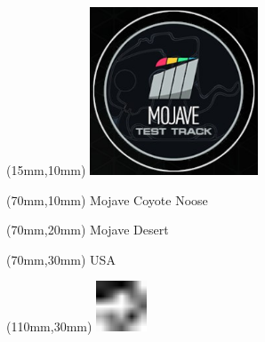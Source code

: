 \null\newpage
\begin{textblock*}{50mm}(15mm,10mm)%
\includegraphics[width=50mm]{LG/MOJA.png}
\end{textblock*}
\begin{textblock*}{130mm}(70mm,10mm)%
{\fontsize{20}{20}\selectfont Mojave Coyote Noose}\\
\end{textblock*}
\begin{textblock*}{120mm}(70mm,20mm)%
{\fontsize{16}{16}\selectfont Mojave Desert}\\
\end{textblock*}
\begin{textblock*}{120mm}(70mm,30mm)%
{\fontsize{12}{12}\selectfont USA}
\end{textblock*}
\begin{textblock*}{30mm}(110mm,30mm)%
\centering
\includegraphics[height=15mm]{icons/fa-rotate-left.pdf}
\end{textblock*}
